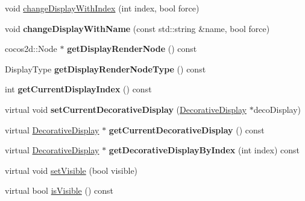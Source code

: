 \begin{DoxyCompactItemize}
void \hyperlink{classcocostudio_1_1DisplayManager_ab0a8f7711c50c31d0c569c35bc62b4b2}{change\+Display\+With\+Index} (int index, bool force)
\item 
\mbox{\label{classcocostudio_1_1DisplayManager_a6c618f38a7a554dd5ce8ba2a25d229dc}} 
void {\bfseries change\+Display\+With\+Name} (const std\+::string \&name, bool force)
\item 
\mbox{\label{classcocostudio_1_1DisplayManager_a387437d74093fbd57bb0049697a8ade8}} 
cocos2d\+::\+Node $\ast$ {\bfseries get\+Display\+Render\+Node} () const
\item 
\mbox{\label{classcocostudio_1_1DisplayManager_aa9db0421fb1c17b9f61d32152fafb2eb}} 
Display\+Type {\bfseries get\+Display\+Render\+Node\+Type} () const
\item 
\mbox{\label{classcocostudio_1_1DisplayManager_a0933f312794a3cb6091fc8a582c5ed6b}} 
int {\bfseries get\+Current\+Display\+Index} () const
\item 
\mbox{\label{classcocostudio_1_1DisplayManager_a4854179b27f47d6198fef53f1aa9faa3}} 
virtual void {\bfseries set\+Current\+Decorative\+Display} (\hyperlink{classcocostudio_1_1DecorativeDisplay}{Decorative\+Display} $\ast$deco\+Display)
\item 
\mbox{\label{classcocostudio_1_1DisplayManager_ab71273e94774efd94096cc348dd8df78}} 
virtual \hyperlink{classcocostudio_1_1DecorativeDisplay}{Decorative\+Display} $\ast$ {\bfseries get\+Current\+Decorative\+Display} () const
\item 
\mbox{\label{classcocostudio_1_1DisplayManager_a37441f69f2d842c5f1cec9987abe90d1}} 
virtual \hyperlink{classcocostudio_1_1DecorativeDisplay}{Decorative\+Display} $\ast$ {\bfseries get\+Decorative\+Display\+By\+Index} (int index) const
\item 
virtual void \hyperlink{classcocostudio_1_1DisplayManager_adc59452ab69d55229d2fce06320379cb}{set\+Visible} (bool visible)
\item 
virtual bool \hyperlink{classcocostudio_1_1DisplayManager_a2ca302efee924451e3f190af4430fe9b}{is\+Visible} () const

\end{DoxyCompactItemize}
